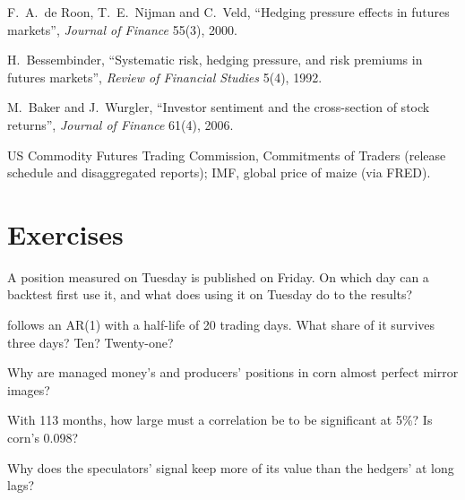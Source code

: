\begin{omsources}
\item F.~A.~de Roon, T.~E.~Nijman and C.~Veld, ``Hedging pressure effects in futures markets'', \emph{Journal of Finance} 55(3), 2000.
\item H.~Bessembinder, ``Systematic risk, hedging pressure, and risk premiums in futures markets'', \emph{Review of Financial Studies} 5(4), 1992.
\item M.~Baker and J.~Wurgler, ``Investor sentiment and the cross-section of stock returns'', \emph{Journal of Finance} 61(4), 2006.
\item US Commodity Futures Trading Commission, Commitments of Traders (release schedule and disaggregated reports); IMF, global price of maize (via
FRED).
\end{omsources}

\section{Exercises}

\begin{exercise}[$\star$]\label{exo:s1:positioning-and-sentiment:1}
A position measured on Tuesday is published on Friday. On which day can a backtest first use it, and what does using it on Tuesday do to the results?
\end{exercise}

\begin{exercise}[$\star$]\label{exo:s1:positioning-and-sentiment:2}
 follows an AR(1) with a half-life of 20 trading days. What share of it survives three days? Ten? Twenty-one?
\end{exercise}

\begin{exercise}[$\star$]\label{exo:s1:positioning-and-sentiment:3}
Why are managed money's and producers' positions in corn almost perfect mirror images?
\end{exercise}

\begin{exercise}[$\star\star$]\label{exo:s1:positioning-and-sentiment:4}
With 113 months, how large must a correlation be to be significant at 5\%? Is corn's 0.098?
\end{exercise}

\begin{exercise}[$\star\star$]\label{exo:s1:positioning-and-sentiment:5}
Why does the speculators' signal keep more of its value than the hedgers' at long lags?
\end{exercise}

